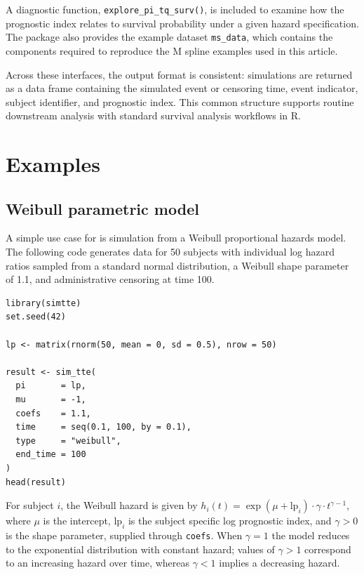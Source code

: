 A diagnostic function, \texttt{explore\_pi\_tq\_surv()}, is included to examine how the prognostic index relates to survival probability under a given hazard specification. The package also provides the example dataset \texttt{ms\_data}, which contains the components required to reproduce the M spline examples used in this article.

Across these interfaces, the output format is consistent: simulations are returned as a data frame containing the simulated event or censoring time, event indicator, subject identifier, and prognostic index. This common structure supports routine downstream analysis with standard survival analysis workflows in R.

\section{Examples}\label{examples}

\subsection{Weibull parametric model}\label{weibull-parametric-model}

A simple use case for  is simulation from a Weibull proportional hazards model. The following code generates data for 50 subjects with individual log hazard ratios sampled from a standard normal distribution, a Weibull shape parameter of 1.1, and administrative censoring at time 100.

\begin{verbatim}
library(simtte)
set.seed(42)

lp <- matrix(rnorm(50, mean = 0, sd = 0.5), nrow = 50)

result <- sim_tte(
  pi       = lp,
  mu       = -1,
  coefs    = 1.1,
  time     = seq(0.1, 100, by = 0.1),
  type     = "weibull",
  end_time = 100
)
head(result)
\end{verbatim}

For subject \(i\), the Weibull hazard is given by \(h_i(t) = \exp(\mu + \text{lp}_i) \cdot \gamma \cdot t^{\gamma - 1}\),
where \(\mu\) is the intercept, \(\text{lp}_i\) is the subject specific log prognostic index, and \(\gamma > 0\) is the shape parameter, supplied through \texttt{coefs}. When \(\gamma = 1\) the model reduces to the exponential distribution with constant hazard; values of \(\gamma > 1\) correspond to an increasing hazard over time, whereas \(\gamma < 1\) implies a decreasing hazard.

